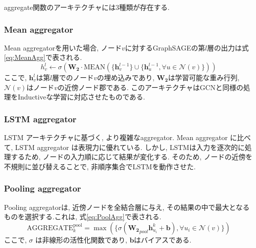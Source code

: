 \documentclass[a4j,twoside,12pt,dvipdfmx]{thesis} %
\begin{document}
aggregate関数のアーキテクチャには3種類が存在する.
\subsubsection{Mean aggregator}
Mean aggregatorを用いた場合, ノード$v$に対するGraphSAGEの第$l$層の出力は式\ref{eq:MeanAgg}で表される.
\begin{equation}
  \label{eq:MeanAgg}
  h_{v}^{l} \leftarrow \sigma(\mathbf{W_{2}} \cdot \mathrm{MEAN} (\{ \mathbf{h}_{v}^{l-1}\} \cup \{ \mathbf{h}_{u}^{l-1} , \forall u \in \mathcal{N}(v) \}))
\end{equation}
ここで, $\mathbf{h}_{v}^{l}$は第$l$層でのノード$v$の埋め込みであり, $\mathbf{W_{2}}$は学習可能な重み行列, $\mathcal{N}(v)$はノード$v$の近傍ノード郡である.
このアーキテクチャはGCNと同様の処理をInductiveな学習に対応させたものである.

\subsubsection{LSTM aggregator}
LSTM アーキテクチャに基づく, より複雑なaggregator. Mean aggregator に比べて, LSTM aggregator は表現力に優れている. しかし, LSTMは入力を逐次的に処理するため, ノードの入力順に応じて結果が変化する. そのため, ノードの近傍を不規則に並び替えることで, 非順序集合でLSTMを動作させた.

\subsubsection{Pooling aggregator}
Pooling aggregatorは, 近傍ノードを全結合層に与え, その結果の中で最大となるものを選択する.これは, 式\ref{eq:PoolAgg}で表される.
\begin{equation}
  \label{eq:PoolAgg}
  \mathrm{AGGREGATE}_{k}^{\mathrm{pool}} = \max(\{ \sigma ( \mathbf{W_{2}}_{pool} \mathbf{h}_{u_{i}}^{k} + \mathbf{b} ), \forall u_{i} \in \mathcal{N}(v) \})
\end{equation}
ここで, $\sigma$ は非線形の活性化関数であり, $\mathbf{b}$はバイアスである.
\end{document}
